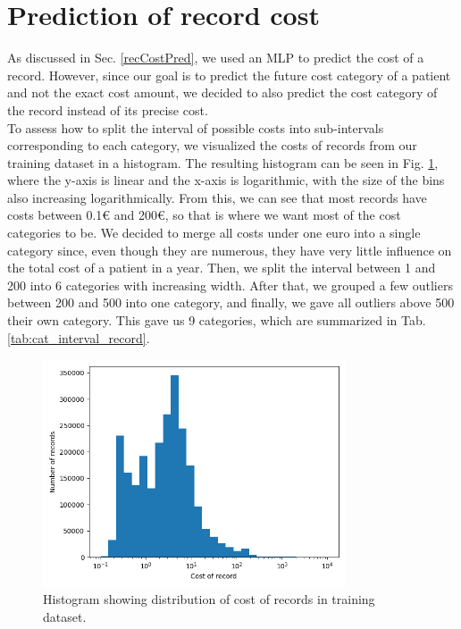 
\section{Prediction of record cost}
\label{costPredImple}

As discussed in Sec. \ref{recCostPred}, we used an MLP to predict the cost of a record. However, since our goal is to predict the future cost category of a patient and not the exact cost amount, we decided to also predict the cost category of the record instead of its precise cost.
\\

To assess how to split the interval of possible costs into sub-intervals corresponding to each category, we visualized the costs of records from our training dataset in a histogram. The resulting histogram can be seen in Fig. \ref{fig:cost_hist}, where the y-axis is linear and the x-axis is logarithmic, with the size of the bins also increasing logarithmically. From this, we can see that most records have costs between 0.1€ and 200€, so that is where we want most of the cost categories to be. We decided to merge all costs under one euro into a single category since, even though they are numerous, they have very little influence on the total cost of a patient in a year. Then, we split the interval between 1 and 200 into 6 categories with increasing width. After that, we grouped a few outliers between 200 and 500 into one category, and finally, we gave all outliers above 500 their own category. This gave us 9 categories, which are summarized in Tab. \ref{tab:cat_interval_record}.

\begin{figure}[!h]
	\centering
	
	\includegraphics[width=0.8\textwidth]{images/cost_hist.png} 
	
	\caption{Histogram showing distribution of cost of records in training dataset.}
	\label{fig:cost_hist}
\end{figure} 

